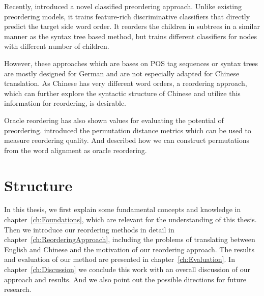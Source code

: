 Recently, \cite{google} introduced a novel classified preordering approach. Unlike existing preordering models, it trains feature-rich discriminative classifiers that directly predict the target side word order. It reorders the children in subtrees in a similar manner as the syntax tree based method, but trains different classifiers for nodes with different number of children.

However, these approaches which are bases on POS tag sequences or syntax trees are mostly designed for German and are not especially adapted for Chinese translation. As Chinese has very different word orders, a reordering approach, which can further explore the syntactic structure of Chinese and utilize this information for reordering, is desirable.

Oracle reordering has also shown values for evaluating the potential of preordering. \cite{metrics} introduced the permutation distance metrics which can be used to measure reordering quality. And \cite{birch2} described how we can construct permutations from the word alignment as oracle reordering.

\section{Structure}
\label{ch:Introduction:sec:Structure}

In this thesis, we first explain some fundamental concepts and knowledge in chapter~\ref{ch:Foundations}, which are relevant for the understanding of this thesis. Then we introduce our reordering methods in detail in chapter~\ref{ch:ReorderingApproach}, including the problems of translating between English and Chinese and the motivation of our reordering approach. The results and evaluation of our method are presented in chapter~\ref{ch:Evaluation}. In chapter~\ref{ch:Discussion} we conclude this work with an overall discussion of our approach and results. And we also point out the possible directions for future research.